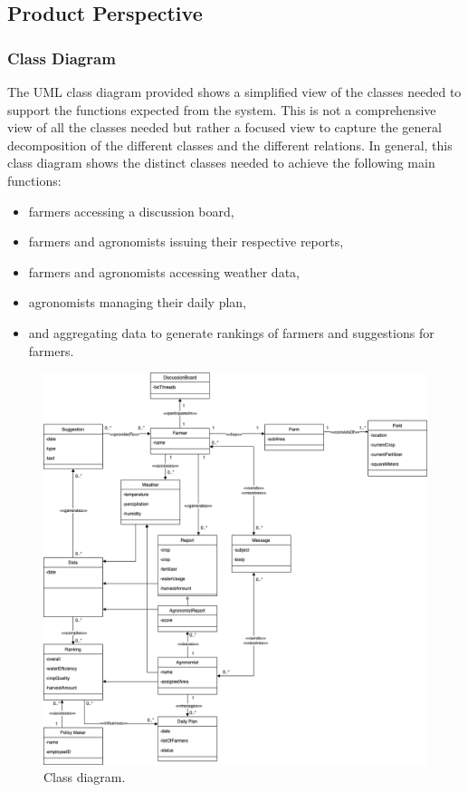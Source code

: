
\subsection{Product Perspective}

\subsubsection{Class Diagram}
The UML class diagram provided shows a simplified view of the classes needed to support the functions expected from the system. This is not a comprehensive view of all the classes needed but rather a focused view to capture the general decomposition of the different classes and the different relations. In general, this class diagram shows the distinct classes needed to achieve the following main functions:
\begin{itemize}
\item farmers accessing a discussion board,
\item farmers and agronomists issuing their respective reports,
\item farmers and agronomists accessing weather data,
\item agronomists managing their daily plan,
\item and aggregating data to generate rankings of farmers and suggestions for farmers. 
\end{itemize} 

\begin{figure}[hbt!]
\centering
\includegraphics[scale=0.35]{../images_diagrams/class_diagram.drawio.png}
\caption{\label{fig:addOne{figure_counter}}Class diagram.}
\end{figure}
\medskip

